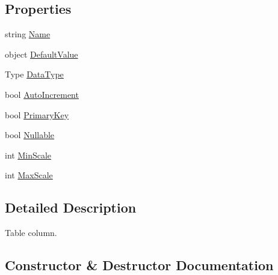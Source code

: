 \subsection*{Properties}
\begin{DoxyCompactItemize}
\item 
string \hyperlink{struct_o_t_a_1_1_data_1_1_table_column_af67f48e7ff2aac91653eb371b9f6366c}{Name}
\item 
object \hyperlink{struct_o_t_a_1_1_data_1_1_table_column_a354b1691336fc1ed244fa8e79dff950b}{Default\+Value}
\item 
Type \hyperlink{struct_o_t_a_1_1_data_1_1_table_column_a745385c93b2d642827cfbb89844e8d8f}{Data\+Type}
\item 
bool \hyperlink{struct_o_t_a_1_1_data_1_1_table_column_a172f715f66c1cce85109c5eee827a74e}{Auto\+Increment}
\item 
bool \hyperlink{struct_o_t_a_1_1_data_1_1_table_column_a3c34ef10d53f12f9d52b5d06686063fc}{Primary\+Key}
\item 
bool \hyperlink{struct_o_t_a_1_1_data_1_1_table_column_a0699f6932f549360f773a0ac8e7eb929}{Nullable}
\item 
int \hyperlink{struct_o_t_a_1_1_data_1_1_table_column_a4a20ec5cb43ed6d7285c10bcc325f4cd}{Min\+Scale}
\item 
int \hyperlink{struct_o_t_a_1_1_data_1_1_table_column_a1e59bc435e2f73ad537ab606fba9428a}{Max\+Scale}
\end{DoxyCompactItemize}


\subsection{Detailed Description}
Table column. 



\subsection{Constructor \& Destructor Documentation}
\hypertarget{struct_o_t_a_1_1_data_1_1_table_column_ab84f99a400117e6a8809152b7205857e}{}
